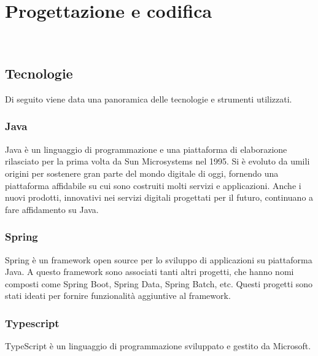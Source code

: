 
\chapter{Progettazione e codifica}
\label{cap:progettazione-codifica}

\\

\section{Tecnologie}
\label{sec:tecnologie-strumenti}

Di seguito viene data una panoramica delle tecnologie e strumenti utilizzati.

\subsection*{Java}
Java è un linguaggio di programmazione e una piattaforma di elaborazione
rilasciato per la prima volta da Sun Microsystems nel 1995. Si è evoluto da
umili
origini per sostenere gran parte del mondo digitale di oggi, fornendo una
piattaforma affidabile su cui sono costruiti molti servizi e applicazioni.
Anche i nuovi prodotti, innovativi nei servizi digitali progettati per il
futuro,
continuano a fare affidamento su Java. \cite{site-what-is-java} \\
\subsection*{Spring}

Spring è un \gls{framework} open source per lo sviluppo di applicazioni su
piattaforma Java.
A questo \gls{framework} sono associati tanti altri progetti, che hanno nomi
composti come
Spring Boot, Spring Data, Spring Batch, etc. Questi progetti sono stati ideati
per
fornire funzionalità aggiuntive al \gls{framework}. \cite{site-spring}

\subsection*{Typescript}
TypeScript è un linguaggio di programmazione sviluppato e gestito da Microsoft.

